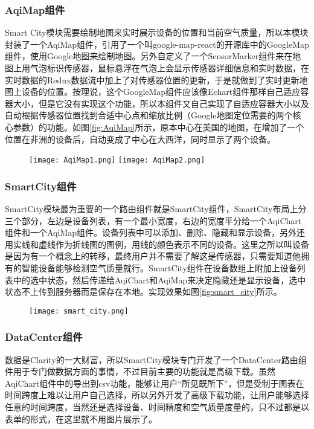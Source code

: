 \subsubsection{AqiMap组件}
Smart City模块需要绘制地图来实时展示设备的位置和当前空气质量，所以本模块封装了一个AqiMap组件，引用了一个叫google-map-react的开源库中的GoogleMap组件，使用Google地图来绘制地图。另外自定义了一个SensorMarker组件来在地图上用气泡标识传感器，鼠标悬浮在气泡上会显示传感器详细信息和实时数据，在实时数据的Redux数据流中加上了对传感器位置的更新，于是就做到了实时更新地图上设备的位置。按理说，这个GoogleMap组件应该像Echart组件那样自己适应容器大小，但是它没有实现这个功能，所以本组件又自己实现了自适应容器大小以及自动根据传感器位置找到合适中心点和缩放比例（Google地图定位需要的两个核心参数）的功能。如图\ref{fig:AqiMap}所示，原本中心在美国的地图，在增加了一个位置在非洲的设备后，自动变成了中心在大西洋，同时显示了两个设备。
\begin{figure}[!htp]
 \centering
 \texttt{[image: AqiMap1.png]}
 \texttt{[image: AqiMap2.png]}
\end{figure}
\subsubsection{SmartCity组件}
SmartCity模块最为重要的一个路由组件就是SmartCity组件，SmartCity布局上分三个部分，左边是设备列表，有一个最小宽度，右边的宽度平分给一个AqiChart组件和一个AqiMap组件。设备列表中可以添加、删除、隐藏和显示设备，另外还用实线和虚线作为折线图的图例，用线的颜色表示不同的设备。这里之所以叫设备是因为有一个概念上的转移，最终用户并不需要了解这是传感器，只需要知道他拥有的智能设备能够检测空气质量就行。SmartCity组件在设备数组上附加上设备列表中的选中状态，然后传递给AqiChart和AqiMap来决定隐藏还是显示设备，选中状态不上传到服务器而是保存在本地。实现效果如图\ref{fig:smart_city}所示。
\begin{figure}[!htp]
 \centering
 \texttt{[image: smart\_city.png]}
\end{figure}
\subsubsection{DataCenter组件}
数据是Clarity的一大财富，所以SmartCity模块专门开发了一个DataCenter路由组件用于专门做数据方面的事情，不过目前主要的功能就是高级下载。虽然AqiChart组件中的导出到csv功能，能够让用户“所见既所下”，但是受制于图表在时间跨度上难以让用户自己选择，所以另外开发了高级下载功能，让用户能够选择任意的时间跨度，当然还是选择设备、时间精度和空气质量度量的，只不过都是以表单的形式，在这里就不用图片展示了。
